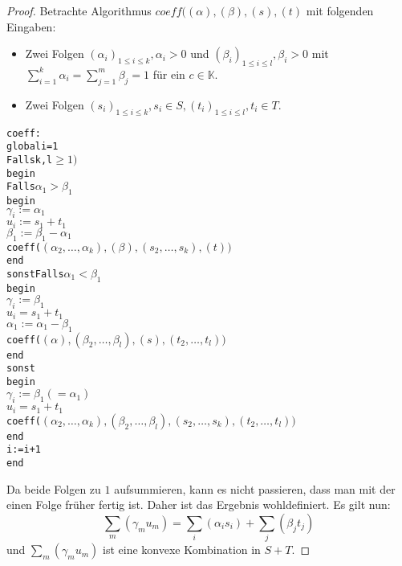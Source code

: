\documentclass[a4paper,10pt,german]{scrartcl}
\newcommand{\K}{\ensuremath{\mathbb{K}}}
\begin{document}
\begin{enumerate}
\begin{proof}
 Betrachte Algorithmus $coeff((\alpha),(\beta),(s),(t)$ mit folgenden Eingaben:
 \begin{itemize}
  \item Zwei Folgen $(\alpha_i)_{1\leq i\leq k},\alpha_i>0$ und $(\beta_i)_{1\leq i\leq l},\beta_i>0$ mit $\sum\limits_{i=1}^k\alpha_i=\sum\limits_{j=1}^m\beta_j=1$ für ein $c\in\K$.
  \item Zwei Folgen $(s_i)_{1\leq i\leq k},s_i\in S,(t_i)_{1\leq i\leq l},t_i\in T$.
 \end{itemize}
 \begin{alltt}coeff:
global i=1
Falls k,l\(\geq 1)\)
  begin
    Falls \(\alpha_1>\beta_1\)
      begin
        \(\gamma_i:=\alpha_1\)
        \(u_i:=s_1+t_1\)
        \(\beta_1:=\beta_1-\alpha_1\)
        coeff(\((\alpha_2,\dots,\alpha_k),(\beta),(s_2,\dots,s_k),(t))\)
      end
    sonst Falls \(\alpha_1<\beta_1\)
            begin
              \(\gamma_i:=\beta_1\)
              \(u_i=s_1+t_1\)
              \(\alpha_1:=\alpha_1-\beta_1\)
              coeff(\((\alpha),(\beta_2,\dots,\beta_l),(s),(t_2,\dots,t_l))\)
            end
         sonst
            begin
              \(\gamma_i:=\beta_1        (=\alpha_1)\)
              \(u_i=s_1+t_1\)
              coeff(\((\alpha_2,\dots,\alpha_k),(\beta_2,\dots,\beta_l),(s_2,\dots,s_k),(t_2,\dots,t_l))\)
            end
  i:=i+1
  end
\end{alltt}
Da beide Folgen zu $1$ aufsummieren, kann es nicht passieren, dass man mit der einen Folge früher fertig ist. Daher ist das Ergebnis wohldefiniert.
Es gilt nun: $$\sum\limits_m(\gamma_mu_m)=\sum\limits_i(\alpha_is_i)+\sum\limits_j(\beta_jt_j)$$
und $\sum\limits_m(\gamma_mu_m)$ ist eine konvexe Kombination in $S+T$.
 \end{proof}
\end{enumerate}
\end{document}
